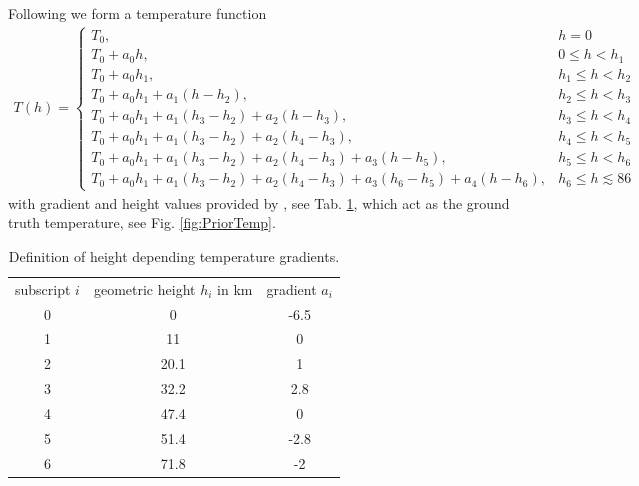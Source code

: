 Following \cite{atmosphere1976us} we form a temperature function
\begin{align}
	T(h) = \begin{cases*}
		T_0, & \text{$h = 0$}\\
		T_0 + a_0 h , & \text{$0 \leq h < h_{1}$}\\
		T_0 + a_0 h_{1}, & \text{$h_{1} \leq  h < h_{2}$}\\
		T_0 + a_0 h_{1} + a_1 (h   - h_2),  & \text{$h_{2} \leq h < h_{3}$}\\
		T_0 + a_0 h_{1} + a_1 (h_{3} - h_{2}) + a_2 (h   - h_3), & \text{$h_{3} \leq h < h_{4}$}\\
		T_0 + a_0 h_{1} + a_1 (h_{3} - h_{2}) + a_2 (h_{4} - h_{3}), & \text{$h_{4} \leq h < h_{5}$}\\
		T_0 + a_0 h_{1} + a_1 (h_{3} - h_{2}) + a_2 (h_{4} - h_{3}) + a_3 (h   - h_{5}), & \text{$h_{5} \leq h < h_{6}$}\\
		T_0 + a_0 h_{1} + a_1 (h_{3} - h_{2}) + a_2 (h_{4} - h_{3}) + a_3 (h_{6} - h_{5}) + a_4 (h - h_{6}), & \text{$h_{6} \leq h \lesssim 86$}
	\end{cases*} 
	\label{eq:tempFunc}
\end{align}
with gradient and height values provided by \cite{atmosphere1976us}, see Tab. \ref{tab:tempGrad}, which act as the ground truth temperature, see Fig. \ref{fig:PriorTemp}.
\begin{table}
	\centering
	\begin{tabular}{ |c||c|c|  }
		\hline
		subscript $i$ & geometric height $h_i$ in km&gradient $a_i$\\
		\hhline{|=||=|=|}
		0& 0 & -6.5\\
		1& 11 & 0\\
		2& 20.1& 1\\
		3& 32.2& 2.8\\
		4& 47.4& 0\\
		5& 51.4& -2.8\\
		6& 71.8& -2\\
		\hline
	\end{tabular}
\caption[Temperature gradients]{Definition of height depending temperature gradients.}
\label{tab:tempGrad}
\end{table}

